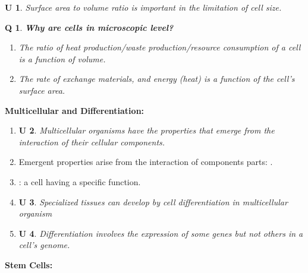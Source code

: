 \documentclass[12pt, a4paper]{article}
\newtheorem{und}{U}[subsection]
\newtheorem{que}{Q}[subsection]
\begin{document}
\begin{und}
    Surface area to volume ratio is important in the limitation of cell size.
\end{und}
\begin{tcolorbox}\begin{que}
    \textbf{Why are cells in microscopic level? }
    \begin{enumerate}
        \item The ratio of heat production/waste production/resource consumption of a cell is a function of volume. 
        \item The rate of exchange materials, and energy (heat) is a function of the cell's surface area. 
    \end{enumerate}
\end{que}\end{tcolorbox}
\textbf{Multicellular and Differentiation: }
\begin{enumerate}
    \item \begin{und} Multicellular organisms have the properties that emerge from the interaction of their cellular components. \end{und}
    \item Emergent properties arise from the interaction of components parts: {\color{red}{The whole is greater than the sum of its parts}}.
    \item \textbf{\color{red}{Differentiation}}: a cell having a specific function. 
    \item \begin{und} Specialized tissues can develop by cell differentiation in multicellular organism \end{und}
    \item \begin{und} Differentiation involves the expression of some genes but not others in a cell's genome. \end{und}
\end{enumerate}
\textbf{Stem Cells: }
\end{document}
